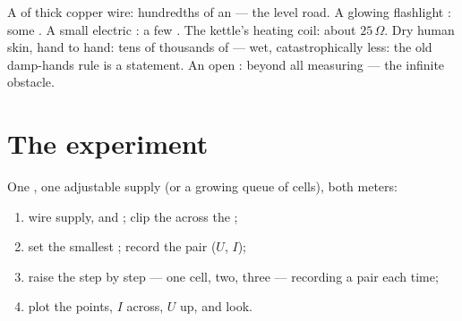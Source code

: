 \begin{example}\label{ex:g8:ohms-law:values}
A  of thick copper wire: hundredths of an  --- the
level road. A glowing flashlight : some . A small
electric : a few . The kettle's heating coil: about
$25\,\Omega$. Dry human skin, hand to hand: tens of thousands
of  --- wet, catastrophically less: the old damp-hands rule
is a  statement. An open :  beyond
all measuring --- the infinite obstacle.
\end{example}

\section{The experiment}

\begin{method}\label{met:g8:ohms-law:portrait}
One , one adjustable supply (or a growing queue of
cells), both meters:
\begin{enumerate}
  \item wire supply,  and  ; clip the
         across the ;
  \item set the smallest ; record the pair ($U$, $I$);
  \item raise the  step by step --- one cell, two,
        three --- recording a pair each time;
  \item plot the points, $I$ across, $U$ up, and look.
\end{enumerate}
\end{method}

